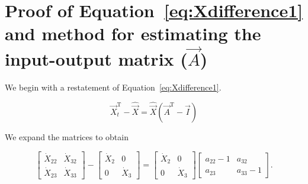 %
%
%

\chapter{Proof of Equation~\ref{eq:Xdifference1} 
and method for estimating the input-output matrix ($\vec{A}$)}
\label{app:Proof} 



We begin with a restatement of Equation~\ref{eq:Xdifference1}.

\begin{equation} \label{eq:Xdifference1Proof-1}
	\vec{X}_{t}^\mathrm{T} 
	- \hat{\vec{X}} 
	= \hat{\vec{X}}(\vec{A}^\mathrm{T} - \vec{I})
\end{equation}

\noindent We expand the matrices to obtain

\begin{equation} \label{eq:Xdifference1Proof-2}
	\begin{bmatrix}
		\dot{X}_{22} & \dot{X}_{32}	\\
		\dot{X}_{23} & \dot{X}_{33}
	\end{bmatrix}
	-
	\begin{bmatrix}
		\dot{X}_{2} & 0	\\
		0           & \dot{X}_{3}
	\end{bmatrix}
	=
	\begin{bmatrix}
		\dot{X}_{2} & 0	\\
		0           & \dot{X}_{3}
	\end{bmatrix}
	\begin{bmatrix}
		a_{22}-1 & a_{32}	\\
		a_{23}   & a_{33}-1
	\end{bmatrix}.
\end{equation}

